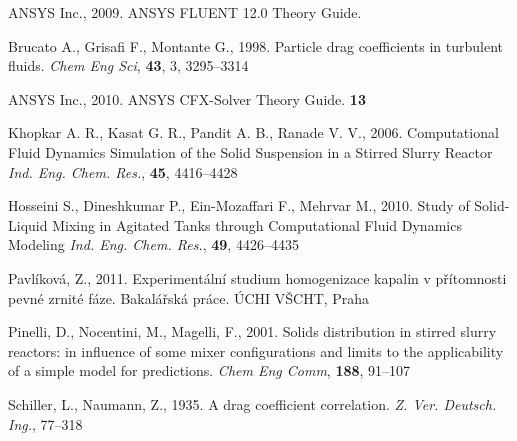 \begin{thebibliography}{99}

 ANSYS Inc., 2009. ANSYS FLUENT 12.0 Theory Guide.

 Brucato A., Grisafi F., Montante G., 1998. Particle drag coefficients in turbulent fluids. \textit{Chem Eng Sci}, \textbf{43}, 3, 3295--3314

 ANSYS Inc., 2010. ANSYS CFX-Solver Theory Guide. \textbf{13}

 Khopkar A. R., Kasat G. R., Pandit A. B., Ranade V. V.,  2006. Computational Fluid Dynamics Simulation of the Solid Suspension in a Stirred Slurry Reactor \textit{Ind. Eng. Chem. Res.}, \textbf{45}, 4416--4428

 Hosseini S., Dineshkumar P., Ein-Mozaffari F., Mehrvar M., 2010. Study of Solid-Liquid Mixing in Agitated Tanks through Computational Fluid Dynamics Modeling \textit{Ind. Eng. Chem. Res.}, \textbf{49}, 4426--4435

 Pavlíková, Z., 2011. Experimentální studium homogenizace kapalin v přítomnosti pevné zrnité fáze. Bakalářská práce. ÚCHI VŠCHT, Praha 

 Pinelli, D., Nocentini, M., Magelli, F., 2001. Solids distribution in stirred slurry reactors: in influence of some mixer configurations and limits to the applicability of a simple model for predictions.
\textit{Chem Eng Comm}, \textbf{188}, 91--107

 Schiller, L., Naumann, Z., 1935. A drag coefficient correlation. \textit{Z. Ver. Deutsch. Ing.}, 77--318

\end{thebibliography}



